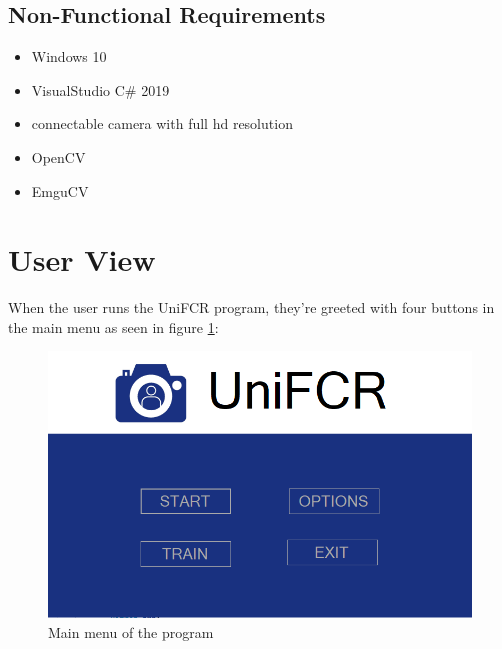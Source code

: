 \documentclass[12pt, a4paper]{article}
\begin{document}
\subsection{Non-Functional Requirements}
\begin{itemize}
\item Windows 10
\item VisualStudio C\# 2019
\item connectable camera with full hd resolution
\item OpenCV
\item EmguCV
\end{itemize}



\newpage



\section{User View}
When the user runs the UniFCR program, they're greeted with four buttons in the main menu as seen in figure \ref{fig:menu}:
\begin{figure}[h!]
	\centering
		\includegraphics[width=1.0\columnwidth]{images/menu}
	\caption{Main menu of the program}
	\label{fig:menu}
\end{figure}
\end{document}
